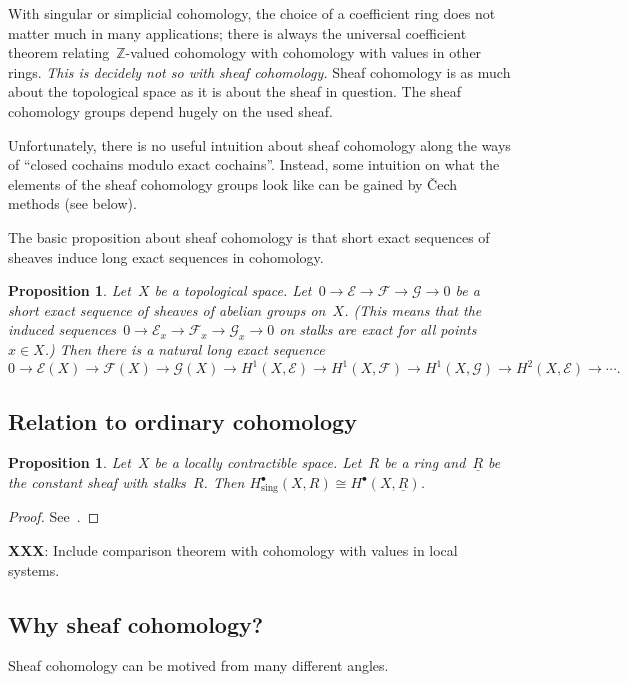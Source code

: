\documentclass[10pt]{amsart}
\theoremstyle{definition}
\theoremstyle{plain}
\newtheorem{prop}[defn]{Proposition}
\theoremstyle{remark}
\newcommand{\E}{\mathcal{E}}
\newcommand{\F}{\mathcal{F}}
\newcommand{\G}{\mathcal{G}}
\newcommand{\ZZ}{\mathbb{Z}}
\begin{document}
With singular or simplicial cohomology, the choice of a coefficient ring does
not matter much in many applications; there is always the universal coefficient
theorem relating~$\ZZ$-valued cohomology with cohomology with values in other
rings. \emph{This is decidely not so with sheaf cohomology.} Sheaf cohomology
is as much about the topological space as it is about the sheaf in question.
The sheaf cohomology groups depend hugely on the used sheaf.

Unfortunately, there is no useful intuition about sheaf cohomology along the
ways of ``closed cochains modulo exact cochains''. Instead, some intuition on
what the elements of the sheaf cohomology groups look like can be gained by
Čech methods (see below).

The basic proposition about sheaf cohomology is that short exact sequences of
sheaves induce long exact sequences in cohomology.

\begin{prop}Let~$X$ be a topological space. Let~$0 \to \E \to \F \to \G \to 0$
be a short exact sequence of sheaves of abelian groups on~$X$. (This means that
the induced sequences~$0 \to \E_x \to \F_x \to \G_x \to 0$ on stalks are exact
for all points~$x \in X$.) Then there is a natural long exact sequence
\[ 0 \to \E(X) \to \F(X) \to \G(X) \to
  H^1(X,\E) \to H^1(X,\F) \to H^1(X,\G) \to H^2(X,\E) \to \cdots. \]
\end{prop}


\subsection{Relation to ordinary cohomology}

\begin{prop}Let~$X$ be a locally contractible space. Let~$R$ be a ring
and~$\underline{R}$ be the constant sheaf with stalks~$R$. Then
$H^\bullet_\text{sing}(X, R) \cong H^\bullet(X, \underline{R})$.
\end{prop}
\begin{proof}See~\cite{cibotaru}.
\end{proof}

\textbf{XXX}: Include comparison theorem with cohomology with values in local
systems.


\subsection{Why sheaf cohomology?}

Sheaf cohomology can be motived from many different angles.
\end{document}
